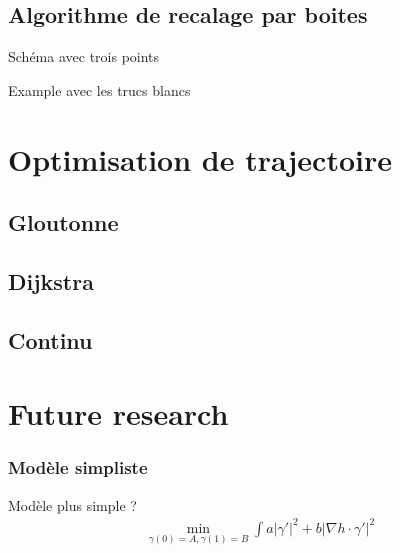 \documentclass[11pt]{beamer}
\begin{document}
\subsection{Algorithme de recalage par boites}
Schéma avec trois points

Example avec les trucs blancs
\section{Optimisation de trajectoire}
\subsection{Gloutonne}
\subsection{Dijkstra}
\subsection{Continu}
\section{Future research}
\begin{frame}
  \frametitle{Modèle simpliste}
Modèle plus simple ?
\begin{align*}
  \min_{\gamma(0) = A, \gamma(1) = B} \int a |\gamma'|^{2} + b |\nabla
  h \cdot \gamma'|^{2}
\end{align*}
\end{frame}
\end{document}
